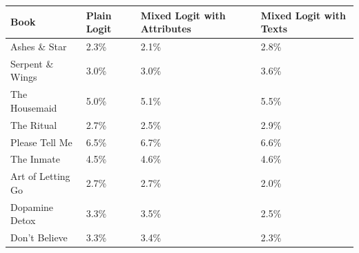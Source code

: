 \begin{centering}
\begin{tabular}{>{\raggedright}p{5cm}>{\raggedright}p{2cm}>{\centering}p{2cm}>{\centering}p{2cm}}
\hline
{\footnotesize\textbf{Book}} & {\footnotesize\textbf{Plain Logit}} & {\footnotesize\textbf{Mixed Logit with Attributes}} & {\footnotesize\textbf{Mixed Logit with Texts}}\tabularnewline
\hline
{\footnotesize Ashes \& Star} & {\footnotesize 2.3\%} & {\footnotesize 2.1\%} & {\footnotesize 2.8\%}\tabularnewline
{\footnotesize Serpent \& Wings} & {\footnotesize 3.0\%} & {\footnotesize 3.0\%} & {\footnotesize 3.6\%}\tabularnewline
{\footnotesize The Housemaid} & {\footnotesize 5.0\%} & {\footnotesize 5.1\%} & {\footnotesize 5.5\%}\tabularnewline
{\footnotesize The Ritual} & {\footnotesize 2.7\%} & {\footnotesize 2.5\%} & {\footnotesize 2.9\%}\tabularnewline
{\footnotesize Please Tell Me} & {\footnotesize 6.5\%} & {\footnotesize 6.7\%} & {\footnotesize 6.6\%}\tabularnewline
{\footnotesize The Inmate} & {\footnotesize 4.5\%} & {\footnotesize 4.6\%} & {\footnotesize 4.6\%}\tabularnewline
{\footnotesize Art of Letting Go} & {\footnotesize 2.7\%} & {\footnotesize 2.7\%} & {\footnotesize 2.0\%}\tabularnewline
{\footnotesize Dopamine Detox} & {\footnotesize 3.3\%} & {\footnotesize 3.5\%} & {\footnotesize 2.5\%}\tabularnewline
{\footnotesize Don't Believe} & {\footnotesize 3.3\%} & {\footnotesize 3.4\%} & {\footnotesize 2.3\%}\tabularnewline
\hline
\end{tabular}
\par\end{centering}